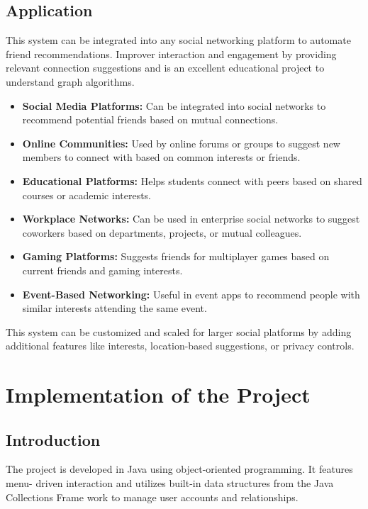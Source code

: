 \documentclass[12pt]{report}
\begin{document}
\section{Application}
This system can be integrated into any social networking platform to automate friend
recommendations. Improver interaction and engagement by providing relevant connection
suggestions and is an excellent educational project to understand graph algorithms.

\begin{itemize}
    \item \textbf{Social Media Platforms:}  
    Can be integrated into social networks to recommend potential friends based on mutual connections.
    
    \item \textbf{Online Communities:}  
    Used by online forums or groups to suggest new members to connect with based on common interests or friends.
    
    \item \textbf{Educational Platforms:}  
    Helps students connect with peers based on shared courses or academic interests.
    
    \item \textbf{Workplace Networks:}  
    Can be used in enterprise social networks to suggest coworkers based on departments, projects, or mutual colleagues.
    
    \item \textbf{Gaming Platforms:}  
    Suggests friends for multiplayer games based on current friends and gaming interests.
    
    \item \textbf{Event-Based Networking:}  
    Useful in event apps to recommend people with similar interests attending the same event.
\end{itemize}

This system can be customized and scaled for larger social platforms by adding additional features like interests, location-based suggestions, or privacy controls.






\newpage
\chapter{Implementation of the Project}

\section{Introduction}
The project is developed in Java using object-oriented programming. It features menu-
driven interaction and utilizes built-in data structures from the Java Collections Frame
work to manage user accounts and relationships.
\end{document}

